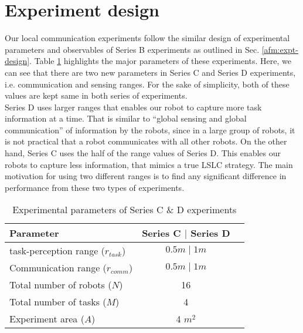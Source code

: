 \section{Experiment design}
\label{local-comm:expt-design}
%
Our local communication experiments follow the similar design of experimental parameters and observables of Series B experiments as outlined in Sec. \ref{afm:expt-design}. Table \ref{table:expt-design} highlights the major parameters of these experiments. Here, we can see that there are two new parameters in Series C and Series D experiments, i.e. communication and sensing ranges. For the sake of simplicity, both of these values are kept same in both series of experiments.\\
Series D uses larger ranges that enables our robot to capture more task information at a time. That is similar to  ``global sensing and global communication'' of information by the robots, since in a large group of robots, it is not practical that a robot communicates with all other robots. On the other hand, Series C uses the half of the range values of Series D. This enables our robots to capture less information, that mimics a true LSLC strategy. The main motivation for using two different ranges is to find any significant difference in performance from these two types of experiments.
\begin{table}
\caption{Experimental parameters of Series C \& D experiments}
\label{table:expt-design}
\begin{center}
\begin{tabular}{|l|c|c|}
\hline Parameter & \hspace*{0.2cm} Series C $\mid$ Series D\\
\hline task-perception range ($r_{task}$) & $0.5 m \mid 1 m$\\
\hline Communication range ($r_{comm}$) & $0.5 m \mid 1 m$\\
\hline Total number of robots ($N$) & 16 \\
\hline Total number of tasks ($M$) & 4 \\
\hline Experiment area ($A$) & 4 $m^2$\\
\hline
\end{tabular}
\end{center}
\end{table}
